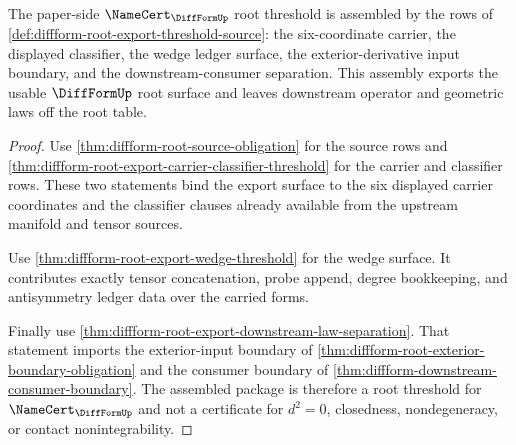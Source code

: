 \begin{theorem}
\label{thm:diffform-root-export-namecert-threshold}
The paper-side $\NameCert_{\DiffFormUp}$ root threshold is assembled by the
rows of \autoref{def:diffform-root-export-threshold-source}: the six-coordinate
carrier, the displayed classifier, the wedge ledger surface, the
exterior-derivative input boundary, and the downstream-consumer separation.
This assembly exports the usable $\DiffFormUp$ root surface and leaves
downstream operator and geometric laws off the root table.
\end{theorem}
\begin{proof}
Use \autoref{thm:diffform-root-source-obligation} for the source rows and
\autoref{thm:diffform-root-export-carrier-classifier-threshold} for the
carrier and classifier rows. These two statements bind the export surface to
the six displayed carrier coordinates and the classifier clauses already
available from the upstream manifold and tensor sources.

Use \autoref{thm:diffform-root-export-wedge-threshold} for the wedge surface.
It contributes exactly tensor concatenation, probe append, degree
bookkeeping, and antisymmetry ledger data over the carried forms.

Finally use \autoref{thm:diffform-root-export-downstream-law-separation}.
That statement imports the exterior-input boundary of
\autoref{thm:diffform-root-exterior-boundary-obligation} and the consumer
boundary of \autoref{thm:diffform-downstream-consumer-boundary}. The assembled
package is therefore a root threshold for $\NameCert_{\DiffFormUp}$ and not a
certificate for $d^2=0$, closedness, nondegeneracy, or contact
nonintegrability.
\end{proof}
